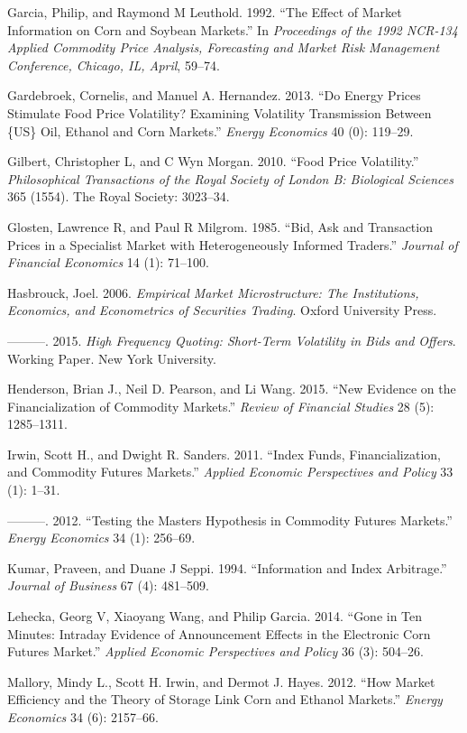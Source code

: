 \documentclass[]{elsarticle} %
\begin{document}
Garcia, Philip, and Raymond M Leuthold. 1992. ``The Effect of Market
Information on Corn and Soybean Markets.'' In \emph{Proceedings of the
1992 NCR-134 Applied Commodity Price Analysis, Forecasting and Market
Risk Management Conference, Chicago, IL, April}, 59--74.

Gardebroek, Cornelis, and Manuel A. Hernandez. 2013. ``Do Energy Prices
Stimulate Food Price Volatility? Examining Volatility Transmission
Between \{US\} Oil, Ethanol and Corn Markets.'' \emph{Energy Economics}
40 (0): 119--29.

Gilbert, Christopher L, and C Wyn Morgan. 2010. ``Food Price
Volatility.'' \emph{Philosophical Transactions of the Royal Society of
London B: Biological Sciences} 365 (1554). The Royal Society: 3023--34.

Glosten, Lawrence R, and Paul R Milgrom. 1985. ``Bid, Ask and
Transaction Prices in a Specialist Market with Heterogeneously Informed
Traders.'' \emph{Journal of Financial Economics} 14 (1): 71--100.

Hasbrouck, Joel. 2006. \emph{Empirical Market Microstructure: The
Institutions, Economics, and Econometrics of Securities Trading}. Oxford
University Press.

---------. 2015. \emph{High Frequency Quoting: Short-Term Volatility in
Bids and Offers}. Working Paper. New York University.

Henderson, Brian J., Neil D. Pearson, and Li Wang. 2015. ``New Evidence
on the Financialization of Commodity Markets.'' \emph{Review of
Financial Studies} 28 (5): 1285--1311.

Irwin, Scott H., and Dwight R. Sanders. 2011. ``Index Funds,
Financialization, and Commodity Futures Markets.'' \emph{Applied
Economic Perspectives and Policy} 33 (1): 1--31.

---------. 2012. ``Testing the Masters Hypothesis in Commodity Futures
Markets.'' \emph{Energy Economics} 34 (1): 256--69.

Kumar, Praveen, and Duane J Seppi. 1994. ``Information and Index
Arbitrage.'' \emph{Journal of Business} 67 (4): 481--509.

Lehecka, Georg V, Xiaoyang Wang, and Philip Garcia. 2014. ``Gone in Ten
Minutes: Intraday Evidence of Announcement Effects in the Electronic
Corn Futures Market.'' \emph{Applied Economic Perspectives and Policy}
36 (3): 504--26.

Mallory, Mindy L., Scott H. Irwin, and Dermot J. Hayes. 2012. ``How
Market Efficiency and the Theory of Storage Link Corn and Ethanol
Markets.'' \emph{Energy Economics} 34 (6): 2157--66.
\end{document}

